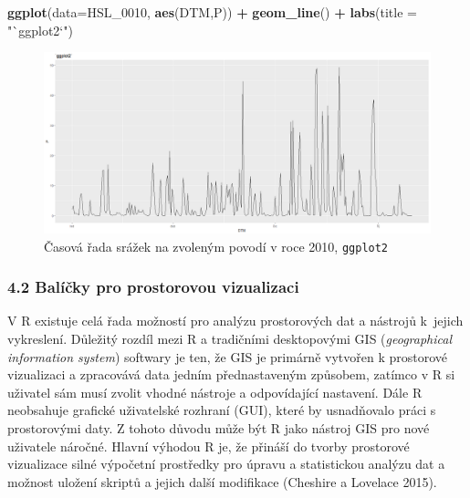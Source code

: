 \documentclass[12pt,]{article}
\newenvironment{Shaded}{\begin{snugshade}}{\end{snugshade}}
\newcommand{\KeywordTok}[1]{\textcolor[rgb]{0.13,0.29,0.53}{\textbf{#1}}}
\newcommand{\DataTypeTok}[1]{\textcolor[rgb]{0.13,0.29,0.53}{#1}}
\newcommand{\DecValTok}[1]{\textcolor[rgb]{0.00,0.00,0.81}{#1}}
\newcommand{\StringTok}[1]{\textcolor[rgb]{0.31,0.60,0.02}{#1}}
\newcommand{\OperatorTok}[1]{\textcolor[rgb]{0.81,0.36,0.00}{\textbf{#1}}}
\newcommand{\NormalTok}[1]{#1}
\begin{document}
\begin{Shaded}
\begin{Highlighting}[]
\KeywordTok{ggplot}\NormalTok{(}\DataTypeTok{data=}\NormalTok{HSL_}\DecValTok{0010}\NormalTok{, }\KeywordTok{aes}\NormalTok{(DTM,P)) }\OperatorTok{+}\StringTok{ }
\StringTok{  }\KeywordTok{geom_line}\NormalTok{() }\OperatorTok{+}\StringTok{ }
\StringTok{  }\KeywordTok{labs}\NormalTok{(}\DataTypeTok{title =} \StringTok{"`ggplot2`"}\NormalTok{)}
\end{Highlighting}
\end{Shaded}

\begin{figure}[H]
      \includegraphics[width=\textwidth]{fig/3ggplot}
      \caption{Časová řada srážek na zvoleným povodí v roce 2010, \texttt{ggplot2}}
      \label{fig:ch4.1c}
\end{figure}

\subsubsection{4.2 Balíčky pro prostorovou
vizualizaci}\label{balicky-pro-prostorovou-vizualizaci}

\qquad V R existuje celá řada možností pro analýzu prostorových dat a
nástrojů k~jejich vykreslení. Důležitý rozdíl mezi R a tradičními
desktopovými GIS (\emph{geographical information system}) softwary je
ten, že GIS je primárně vytvořen k prostorové vizualizaci a zpracovává
data jedním přednastaveným způsobem, zatímco v R si uživatel sám musí
zvolit vhodné nástroje a odpovídající nastavení. Dále R neobsahuje
grafické uživatelské rozhraní (GUI), které by usnadňovalo práci s
prostorovými daty. Z tohoto důvodu může být R jako nástroj GIS pro nové
uživatele náročné. Hlavní výhodou R je, že přináší do tvorby prostorové
vizualizace silné výpočetní prostředky pro úpravu a statistickou analýzu
dat a možnost uložení skriptů a jejich další modifikace (Cheshire a
Lovelace 2015).
\end{document}

